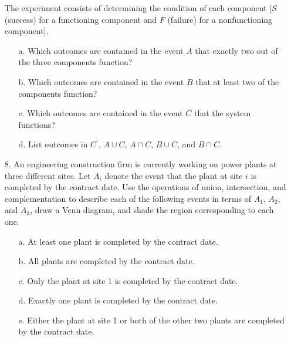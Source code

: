 \documentclass[letterpaper,12pt]{article}
\begin{document}
\begin{enumerate}
\begin{center}
    \end{center}
    The experiment consists of determining the condition of each component [$S$ (success) for a functioning component and $F$ (failure) for a nonfunctioning component].
    \begin{enumerate}
      \item[a.]
        Which outcomes are contained in the event $A$ that exactly two out of the three components function?
      \item[b.]
        Which outcomes are contained in the event $B$ that at least two of the components function?
      \item[c.]
        Which outcomes are contained in the event $C$ that the system functions?
      \item[d.]
        List outcomes in $C^\prime$, $A \cup C$, $A \cap C$, $B \cup C$, and $B \cap C$.
    \end{enumerate}
  \item[8.]
    An engineering construction firm is currently working on power plants at three different sites. Let $A_i$ denote the event that the plant at site $i$ is completed by the contract date. Use the operations of union, intersection, and complementation to describe each of the following events in terms of $A_1$, $A_2$, and $A_3$, draw a Venn diagram, and shade the region corresponding to each one.
    \begin{enumerate}
      \item[a.]
        At least one plant is completed by the contract date.
      \item[b.]
        All plants are completed by the contract date.
      \item[c.]
        Only the plant at site 1 is completed by the contract date.
      \item[d.]
        Exactly one plant is completed by the contract date.
      \item[e.]
        Either the plant at site 1 or both of the other two plants are completed by the contract date.
    \end{enumerate}
\end{enumerate}
\end{document}
